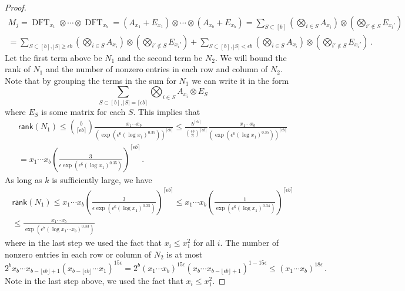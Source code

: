 \documentclass{toc}
\newcommand\rank{\textsf{rank}}
\DeclareMathOperator{\DFT}{DFT}
\begin{document}
\begin{proof}
%
%
%
%
\begin{align*}
M_j = \DFT_{x_1} \otimes \cdots \otimes \DFT_{x_b}   = (A_{x_1} + E_{x_1}) \otimes \cdots \otimes (A_{x_b} + E_{x_b}) = \sum_{S \subset [b]}\left(\bigotimes_{i \in S}A_{x_i}\right) \otimes \left(\bigotimes_{i' \notin S}E_{x_i'}\right) \\ = \sum_{S \subset [b], |S| \geq \epsilon b}\left(\bigotimes_{i \in S}A_{x_i}\right)\otimes \left(\bigotimes_{i' \notin S}E_{x_i'} \right)+ \sum_{S \subset [b], |S| < \epsilon b}\left(\bigotimes_{i \in S}A_{x_i}\right)\otimes \left(\bigotimes_{i' \notin S}E_{x_i'} \right) \,.
\end{align*}
%
Let the first term above be $N_1$ and the second term be $N_2$.  We will bound the rank of $N_1$ and the number of nonzero entries in each row and column of $N_2$. Note that by grouping the terms in the sum for $N_1$ we can write it in the form
\[
\sum_{S \subset [b], |S| = \lceil \epsilon b \rceil}\bigotimes_{i \in S}A_{x_i} \otimes E_S
\]
where %
$E_S$ is some matrix for each $S$. %
%
 This implies that 
\begin{align*}
\rank(N_1) \leq \binom{b}{\lceil \epsilon b \rceil} \frac{x_1 \cdots x_b}{\left(\exp\left(\epsilon^6 (\log x_1)^{0.35}\right)\right)^{\lceil \epsilon b \rceil}} \leq \frac{b^{\lceil \epsilon b \rceil}}{( \frac{\epsilon b}{3})^{\lceil \epsilon b \rceil}}\frac{x_1 \cdots x_b}{\left(\exp\left(\epsilon^6 (\log x_1)^{0.35}\right)\right)^{\lceil \epsilon b \rceil}} \\ = x_1 \cdots x_b\left( \frac{3}{\epsilon \exp\left(\epsilon^6 (\log x_1)^{0.35}\right)} \right)^{\lceil \epsilon b \rceil} \,.
\end{align*}
As long as $k$ is sufficiently large, we have
%
\begin{eqnarray*}
\rank(N_1) \leq x_1 \cdots x_b\left( \frac{3}{\epsilon \exp\left(\epsilon^6 (\log x_1)^{0.35}\right)} \right)^{\lceil \epsilon b \rceil} \leq x_1 \cdots x_b\left( \frac{1}{\exp\left(\epsilon^6 (\log x_1)^{0.34}\right)} \right)^{\lceil \epsilon b \rceil}  \\ \leq \frac{ x_1 \cdots x_b}{\exp\left(\epsilon^7 (\log x_1 \cdots x_b )^{0.33}\right)}
\end{eqnarray*}
where in the last step we used the fact that $x_i \leq x_1^2$ for all $i$.  The number of nonzero entries in each row or column of $N_2$ is at most 
\[
2^b x_b \cdots x_{b - \lfloor \epsilon b\rfloor + 1}(x_{b - \lfloor \epsilon b\rfloor} \cdots x_1)^{15\epsilon} = 2^b (x_1 \cdots x_b)^{15\epsilon}(x_b \cdots x_{b - \lfloor \epsilon b\rfloor + 1})^{1 - 15\epsilon} \leq (x_1 \cdots x_b)^{18\epsilon} \,.
\]
Note in the last step above, we used the fact that $x_i \leq x_1^2$.


\end{proof}
\end{document}
